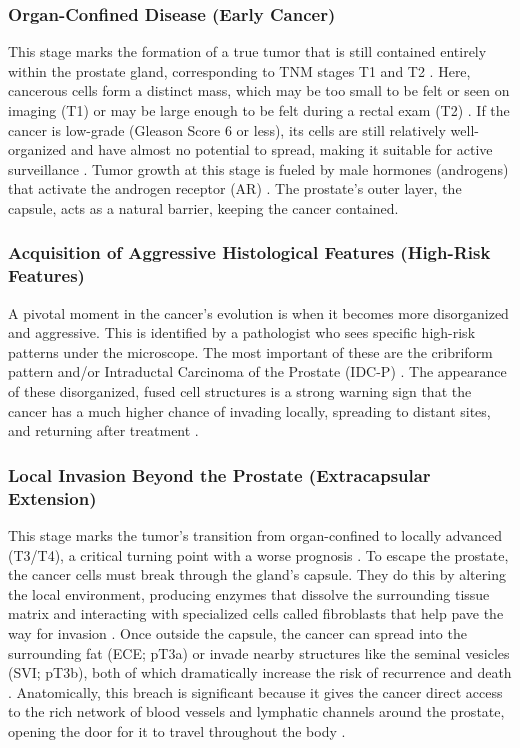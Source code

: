 \documentclass[11pt, a4paper]{article}
\begin{document}
\subsubsection{Organ-Confined Disease (Early Cancer)}
This stage marks the formation of a true tumor that is still contained entirely within the prostate gland, corresponding to TNM stages T1 and T2 \cite{PasoglouMichoux2016, UnknownAuthor2017}. Here, cancerous cells form a distinct mass, which may be too small to be felt or seen on imaging (T1) or may be large enough to be felt during a rectal exam (T2) \cite{CaglicKovac2019, OliveiraFerreira2023}. If the cancer is low-grade (Gleason Score 6 or less), its cells are still relatively well-organized and have almost no potential to spread, making it suitable for active surveillance \cite{UnknownAuthor2017, DrostOsses2019}. Tumor growth at this stage is fueled by male hormones (androgens) that activate the androgen receptor (AR) \cite{UnknownAuthor2014, MartinCaraballo2024}. The prostate's outer layer, the capsule, acts as a natural barrier, keeping the cancer contained.

\subsubsection{Acquisition of Aggressive Histological Features (High-Risk Features)}
A pivotal moment in the cancer's evolution is when it becomes more disorganized and aggressive. This is identified by a pathologist who sees specific high-risk patterns under the microscope. The most important of these are the cribriform pattern and/or Intraductal Carcinoma of the Prostate (IDC-P) \cite{GordetskySchaffer2022, HesterbergGordetsky2021, BernardinoSayyid2023}. The appearance of these disorganized, fused cell structures is a strong warning sign that the cancer has a much higher chance of invading locally, spreading to distant sites, and returning after treatment \cite{HesterbergGordetsky2021, GaoZhang2020}.

\subsubsection{Local Invasion Beyond the Prostate (Extracapsular Extension)}
This stage marks the tumor's transition from organ-confined to locally advanced (T3/T4), a critical turning point with a worse prognosis \cite{OliveiraFerreira2023, CarpagnanoEusebi2020}. To escape the prostate, the cancer cells must break through the gland's capsule. They do this by altering the local environment, producing enzymes that dissolve the surrounding tissue matrix and interacting with specialized cells called fibroblasts that help pave the way for invasion \cite{UnknownAuthor2012, PenetKakkad2017}. Once outside the capsule, the cancer can spread into the surrounding fat (ECE; pT3a) or invade nearby structures like the seminal vesicles (SVI; pT3b), both of which dramatically increase the risk of recurrence and death \cite{FanXie2022, ErbayOzden2020}. Anatomically, this breach is significant because it gives the cancer direct access to the rich network of blood vessels and lymphatic channels around the prostate, opening the door for it to travel throughout the body \cite{FanXie2022}.
\end{document}
